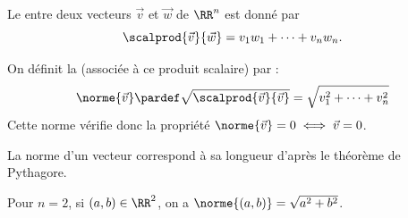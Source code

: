 \begin{frame}
  \begin{definition}
    Le  entre deux vecteurs \(\vec v\) et \(\vec w\) de \(\RR^{n}\) est donné par
    \begin{equation*}
      \scalprod {\vec v} {\vec w} = v_{1} w_{1} + \cdots + v_{n} w_{n}.
    \end{equation*}
  \end{definition}

\end{frame}

\begin{frame}
  On définit la  (associée à ce produit scalaire) par :
  \begin{equation*}
    \norme {\vec v} \pardef \sqrt{\scalprod{\vec v}{\vec v}} = \sqrt{v_{1}^{2}  + \cdots + v_{n}^{2}}
  \end{equation*}\pause
  Cette norme vérifie donc la propriété \(\norme{\vec v} = 0 \iff \vec v = 0\).\pause

  \begin{remark*}
    La \og norme\fg{} d'un vecteur correspond à sa \og longueur\fg{} d'après le théorème de Pythagore.
  \end{remark*}\pause

  \begin{example}
    Pour \(n = 2\), si \((a,b) \in \RR^2\), on a \(\norme{(a,b)} = \sqrt{a^{2} + b^{2}}\).
  \end{example}
\end{frame}

